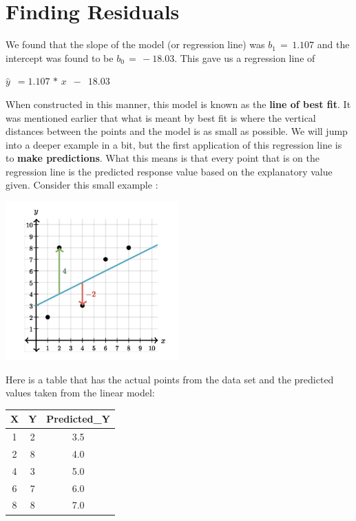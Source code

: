 \documentclass[
  letterpaper,
  DIV=11,
  numbers=noendperiod]{scrreprt}
\begin{document}
\section*{Finding Residuals}\label{finding-residuals}


We found that the slope of the model (or regression line) was
\(b_1 \,= \,1.107\) and the intercept was found to be
\(b_0\, = \,-18.03\). This gave us a regression line of

\(\displaystyle{\hat{y} \,\,\, = 1.107\,*\, x \,\,\, - \,\,\, 18.03}\)

When constructed in this manner, this model is known as the \textbf{line
of best fit}. It was mentioned earlier that what is meant by best fit is
where the vertical distances between the points and the model is as
small as possible. We will jump into a deeper example in a bit, but the
first application of this regression line is to \textbf{make
predictions}. What this means is that every point that is on the
regression line is the predicted response value based on the explanatory
value given. Consider this small example :

\includegraphics[width=0.5\textwidth,height=\textheight]{./images/ROP_1.jpg}

Here is a table that has the actual points from the data set and the
predicted values taken from the linear model:

\begin{longtable*}[t]{ccc}
\toprule
X & Y & Predicted\_Y\\
 & 2 & 3.5\\
2 & 8 & 4.0\\
4 & 3 & 5.0\\
6 & 7 & 6.0\\
8 & 8 & 7.0\\
\bottomrule
\end{longtable*}
\end{document}
